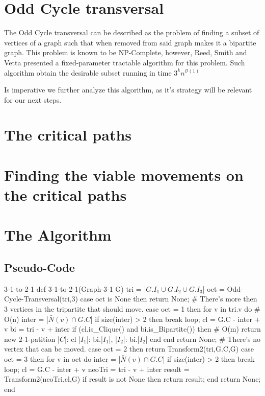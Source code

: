 \section{Odd Cycle transversal}\label{sec:oct}

The Odd Cycle transversal can be described as the problem of finding a subset of vertices of a graph such that when removed from said graph makes it a bipartite graph.
This problem is known to be NP-Complete, however, Reed, Smith and Vetta presented a fixed-parameter tractable algorithm for this problem.
Such algorithm obtain the desirable subset running in time $3^kn^{\mathcal{O}(1)}$ \cite{reed-04}

Is imperative we further analyze this algorithm, as it's strategy will be relevant for our next steps.

\section{The critical paths}\label{sec:tcp}


\section{Finding the viable movements on the critical paths}\label{sec:path-movements}


\section{The Algorithm}

\subsection{Pseudo-Code}

\begin{code}{3-1-to-2-1}
def 3-1-to-2-1(Graph-3-1 G)
  tri = |$G.I_1 \cup G.I_2 \cup G.I_3$| 
  oct = Odd-Cycle-Transversal(tri,3)
  case oct is None then
    return None; # There's more then 3 vertices in the tripartite that should move.
  case oct = 1 then
    for v in tri.v do # O(n)
      inter = |$\bar{N}(v) \cap G.C$|
      if size(inter) > 2 then
        break loop; 
      cl = G.C - inter + v
      bi = tri - v + inter
      if (cl.is_Clique() and bi.is_Bipartite()) then # O(m)
        return new 2-1-patition{
          |$C$|: cl
          |$I_1$|: bi.|$I_1$|,
          |$I_2$|: bi.|$I_2$|
        }
      end
    end
    return None; # There's no vertex that can be moved.
  case oct = 2 then
    return Transform2(tri,G.C,G)
  case oct = 3 then
    for v in oct do
      inter = |$\bar{N}(v) \cap G.C$|
      if size(inter) > 2 then
        break loop; 
      cl = G.C - inter + v
      neoTri = tri - v + inter
      result = Transform2(neoTri,cl,G)
      if result is not None then
        return result;
    end
    return None; 
end
\end{code}

